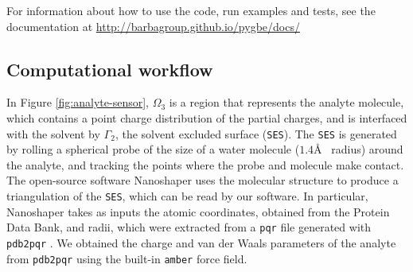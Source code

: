 For information about how to use the code, run examples and tests, see the
\pygbe documentation at \url{http://barbagroup.github.io/pygbe/docs/}

\subsection{Computational workflow}
In Figure \ref{fig:analyte-sensor}, $\Omega_3$ is a region that represents the analyte molecule, which contains a point charge distribution of the partial charges, and is interfaced with the solvent by $\Gamma_2$, the solvent excluded surface (\texttt{SES}).
The \texttt{SES} is generated by rolling a spherical probe of the size of a water molecule ($1.4$\AA~ radius) around the analyte, and tracking the points where the probe and molecule make contact.
The open-source software Nanoshaper \cite{Nanoshaper} uses the molecular structure to produce a triangulation of the \texttt{SES}, which can be read by our software.
In particular, Nanoshaper takes as inputs the atomic coordinates, obtained from the Protein Data Bank, and radii, which were 
extracted from a \texttt{pqr} file generated with \texttt{pdb2pqr} \cite{Dolinsky04}.
We obtained the charge and van der Waals parameters of the analyte from \texttt{pdb2pqr} using the built-in \texttt{amber} force field.

